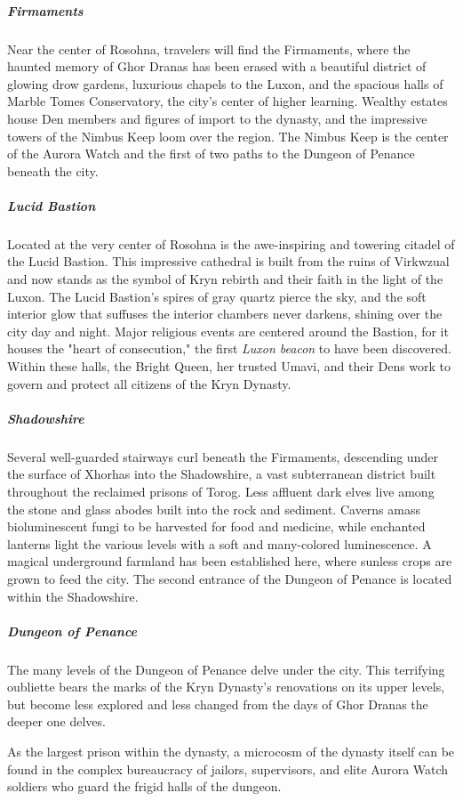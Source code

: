 \documentclass[10pt,a4paper,twoside,bg=print,twocolumn,openany,nodeprecatedcode]{dndbook}
\begin{document}
\subparagraph{Firmaments}
Near the center of Rosohna, travelers will find the Firmaments, where the haunted memory of Ghor Dranas has been erased with a beautiful district of glowing drow gardens, luxurious chapels to the Luxon, and the spacious halls of Marble Tomes Conservatory, the city's center of higher learning. Wealthy estates house Den members and figures of import to the dynasty, and the impressive towers of the Nimbus Keep loom over the region. The Nimbus Keep is the center of the Aurora Watch and the first of two paths to the Dungeon of Penance beneath the city.

\subparagraph{Lucid Bastion}
Located at the very center of Rosohna is the awe-inspiring and towering citadel of the Lucid Bastion. This impressive cathedral is built from the ruins of Virkwzual and now stands as the symbol of Kryn rebirth and their faith in the light of the Luxon. The Lucid Bastion's spires of gray quartz pierce the sky, and the soft interior glow that suffuses the interior chambers never darkens, shining over the city day and night. Major religious events are centered around the Bastion, for it houses the "heart of consecution," the first \textit{Luxon beacon} to have been discovered. Within these halls, the Bright Queen, her trusted Umavi, and their Dens work to govern and protect all citizens of the Kryn Dynasty.

\subparagraph{Shadowshire}
Several well-guarded stairways curl beneath the Firmaments, descending under the surface of Xhorhas into the Shadowshire, a vast subterranean district built throughout the reclaimed prisons of Torog. Less affluent dark elves live among the stone and glass abodes built into the rock and sediment. Caverns amass bioluminescent fungi to be harvested for food and medicine, while enchanted lanterns light the various levels with a soft and many-colored luminescence. A magical underground farmland has been established here, where sunless crops are grown to feed the city. The second entrance of the Dungeon of Penance is located within the Shadowshire.

\subparagraph{Dungeon of Penance}
The many levels of the Dungeon of Penance delve under the city. This terrifying oubliette bears the marks of the Kryn Dynasty's renovations on its upper levels, but become less explored and less changed from the days of Ghor Dranas the deeper one delves.

As the largest prison within the dynasty, a microcosm of the dynasty itself can be found in the complex bureaucracy of jailors, supervisors, and elite Aurora Watch soldiers who guard the frigid halls of the dungeon.
\end{document}
